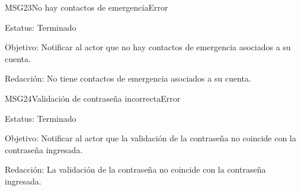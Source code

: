 \begin{mensaje}{MSG23}{No hay contactos de emergencia}{Error}
	\item[Estatus:] Terminado
	\item[Objetivo:] Notificar al actor que no hay contactos de emergencia asociados a su cuenta.
	\item[Redacción:] No tiene contactos de emergencia asociados a su cuenta.
\end{mensaje}

\begin{mensaje}{MSG24}{Validación de contraseña incorrecta}{Error}
	\item[Estatus:] Terminado
	\item[Objetivo:] Notificar al actor que la validación de la contraseña no coincide con la contraseña ingresada.
	\item[Redacción:] La validación de la contraseña no coincide con la contraseña ingresada.
\end{mensaje}

